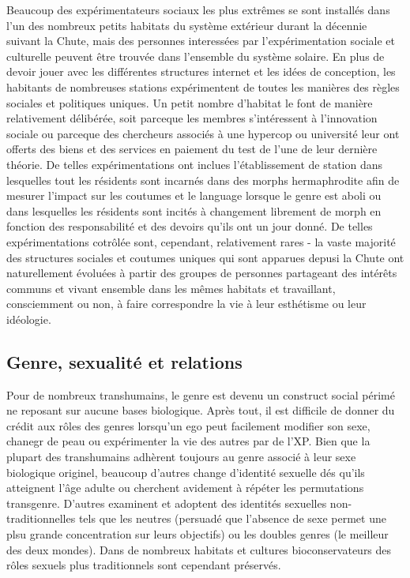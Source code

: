       Beaucoup des expérimentateurs sociaux les plus extrêmes se sont installés dans l'un des nombreux petits habitats du système extérieur durant la décennie suivant la Chute, mais des personnes interessées par l'expérimentation sociale et culturelle peuvent être trouvée dans l'ensemble du système solaire. En plus de devoir jouer avec les différentes structures internet et les idées de conception, les habitants de nombreuses stations expérimentent de toutes les manières des règles sociales et politiques uniques. Un petit nombre d'habitat le font de manière relativement délibérée, soit parceque les membres s'intéressent à l'innovation sociale ou parceque des chercheurs associés à une hypercop ou université leur ont offerts des biens et des services en paiement du test de l'une de leur dernière théorie. De telles expérimentations ont inclues l'établissement de station dans lesquelles tout les résidents sont incarnés dans des morphs hermaphrodite afin de mesurer l'impact sur les coutumes et le language lorsque le genre est aboli ou dans lesquelles les résidents sont incités à changement librement de morph en fonction des responsabilité et des devoirs qu'ils ont un jour donné. De telles expérimentations cotrôlée sont, cependant, relativement rares - la vaste majorité des structures sociales et coutumes uniques qui sont apparues depusi la Chute ont naturellement évoluées à partir des groupes de personnes partageant des intérêts communs et vivant ensemble dans les mêmes habitats et travaillant, consciemment ou non, à faire correspondre la vie à leur esthétisme ou leur idéologie. 

      \subsection{Genre, sexualité et relations} \label{sec:gend-sexu-relat} 

      Pour de nombreux transhumains, le genre est devenu un construct social périmé ne reposant sur aucune bases biologique. Après tout, il est difficile de donner du crédit aux rôles des genres lorsqu'un ego peut facilement modifier son sexe, chanegr de peau ou expérimenter la vie des autres par de l'XP. Bien que la plupart des transhumains adhèrent toujours au genre associé à leur sexe biologique originel, beaucoup d'autres change d'identité sexuelle dés qu'ils atteignent l'âge adulte ou cherchent avidement à répéter les permutations transgenre. D'autres examinent et adoptent des identités sexuelles non-traditionnelles tels que les neutres (persuadé que l'absence de sexe permet une plsu grande concentration sur leurs objectifs) ou les doubles genres (le meilleur des deux mondes). Dans de nombreux habitats et cultures bioconservateurs des rôles sexuels plus traditionnels sont cependant préservés. 

